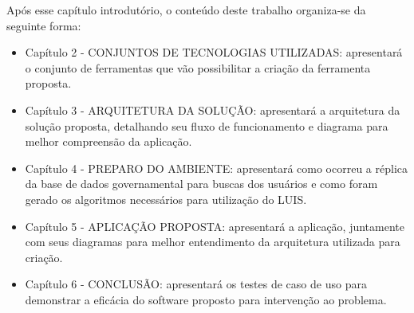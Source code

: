 Após esse capítulo introdutório, o conteúdo deste trabalho organiza-se da seguinte forma:
\begin{itemize}
	\item Capítulo 2 - \uppercase{Conjuntos de tecnologias utilizadas}: apresentará o conjunto de ferramentas que vão possibilitar a criação da ferramenta proposta.
	\item Capítulo 3 - \uppercase{Arquitetura da solução}: apresentará a arquitetura da solução proposta, detalhando seu fluxo de funcionamento e diagrama para melhor compreensão da aplicação.
	\item Capítulo 4 - \uppercase{Preparo do ambiente}: apresentará como ocorreu a réplica da base de dados governamental para buscas dos usuários e como foram gerado os algoritmos necessários para utilização do LUIS.
	\item Capítulo 5 - \uppercase{Aplicação proposta}: apresentará a aplicação, juntamente com seus diagramas para melhor entendimento da arquitetura utilizada para criação.
	\item Capítulo 6 - \uppercase{Conclusão}: apresentará os testes de caso de uso para demonstrar a eficácia do software proposto para intervenção ao problema.
\end{itemize}
